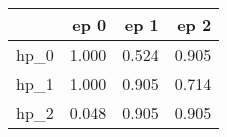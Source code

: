 \begin{tabular}{lrrr}
\toprule
{} &   ep 0 &   ep 1 &   ep 2 \\
\midrule
hp\_0 &  1.000 &  0.524 &  0.905 \\
hp\_1 &  1.000 &  0.905 &  0.714 \\
hp\_2 &  0.048 &  0.905 &  0.905 \\
\bottomrule
\end{tabular}
